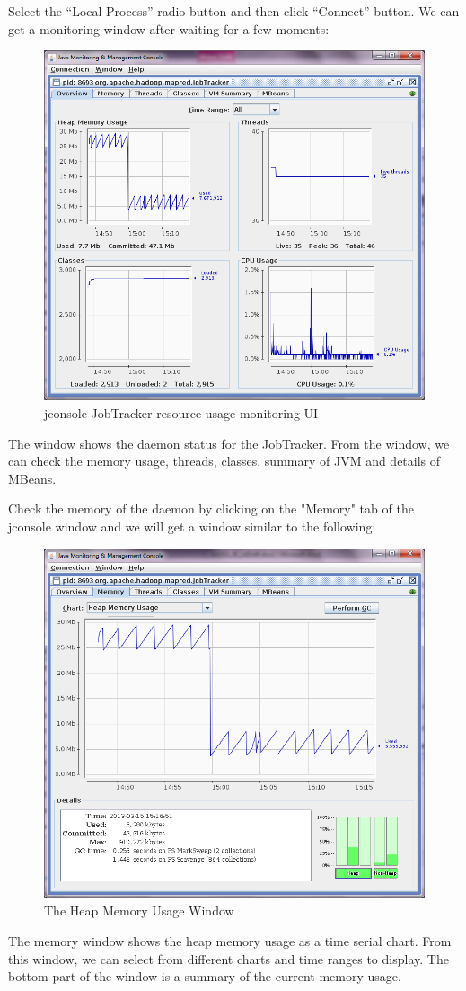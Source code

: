 Select the ``Local Process'' radio button and then click ``Connect'' button. We can get a monitoring window after waiting for a few moments:
\begin{figure}[ht]
  \centering
  \includegraphics[width=.7\textwidth]{figs/5163os_06_02.png}
  \caption{jconsole JobTracker resource usage monitoring UI}\label{fig:jconsole.jobtracker}
\end{figure} 
The window shows the daemon status for the JobTracker. From the window, we can check the memory usage, threads, classes, summary of JVM and details of MBeans.

Check the memory of the daemon by clicking on the "Memory" tab of the jconsole window and we will get a window similar to the following:
\begin{figure}[ht]
  \centering
  \includegraphics[width=.7\textwidth]{figs/5163os_06_03.png}
  \caption{The Heap Memory Usage Window}\label{fig:heap.usage.window}
\end{figure} 
The memory window shows the heap memory usage as a time serial chart. From this window, we can select from different charts and time ranges to display. The bottom part of the window is a summary of the current memory usage.

